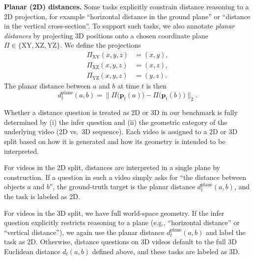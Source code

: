 \noindent\textbf{Planar (2D) distances.}
Some tasks explicitly constrain distance reasoning to a 2D projection, for example ``horizontal distance in the ground plane'' or ``distance in the vertical cross-section''. To support such tasks, we also annotate \emph{planar distances} by projecting 3D positions onto a chosen coordinate plane \(\Pi \in \{\mathrm{XY}, \mathrm{XZ}, \mathrm{YZ}\}\). We define the projections
\[
\begin{aligned}
\Pi_{\mathrm{XY}}(x,y,z) &= (x,y),\\
\Pi_{\mathrm{XZ}}(x,y,z) &= (x,z),\\
\Pi_{\mathrm{YZ}}(x,y,z) &= (y,z).
\end{aligned}
\]
The planar distance between \(a\) and \(b\) at time \(t\) is then
\[
d^{\text{plane}}_t(a,b)
= \bigl\lVert \Pi\bigl(\mathbf{p}_t(a)\bigr) - \Pi\bigl(\mathbf{p}_t(b)\bigr) \bigr\rVert_2.
\]

Whether a distance question is treated as 2D or 3D in our benchmark is fully determined by (i) the infer question and (ii) the geometric category of the underlying video (2D vs.\ 3D sequence). Each video is assigned to a 2D or 3D split based on how it is generated and how its geometry is intended to be interpreted.

For videos in the 2D split, distances are interpreted in a single plane by construction. If a question in such a video simply asks for ``the distance between objects \(a\) and \(b\)'', the ground-truth target is the planar distance \(d^{\text{plane}}_t(a,b)\), and the task is labeled as 2D.

For videos in the 3D split, we have full world-space geometry. If the infer question explicitly restricts reasoning to a plane (e.g., ``horizontal distance'' or ``vertical distance''), we again use the planar distance \(d^{\text{plane}}_t(a,b)\) and label the task as 2D. Otherwise, distance questions on 3D videos default to the full 3D Euclidean distance \(d_t(a,b)\) defined above, and these tasks are labeled as 3D.

